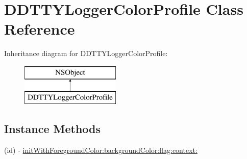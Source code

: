 \hypertarget{interface_d_d_t_t_y_logger_color_profile}{\section{D\-D\-T\-T\-Y\-Logger\-Color\-Profile Class Reference}
\label{interface_d_d_t_t_y_logger_color_profile}
}
Inheritance diagram for D\-D\-T\-T\-Y\-Logger\-Color\-Profile\-:\begin{figure}[H]
\begin{center}
\leavevmode
\includegraphics[height=2.000000cm]{interface_d_d_t_t_y_logger_color_profile}
\end{center}
\end{figure}
\subsection*{Instance Methods}
\begin{DoxyCompactItemize}
\item 
(id) -\/ \hyperlink{interface_d_d_t_t_y_logger_color_profile_ac46520dfe6a649abcdf5054c46bb843b}{init\-With\-Foreground\-Color\-:background\-Color\-:flag\-:context\-:}
\end{DoxyCompactItemize}
